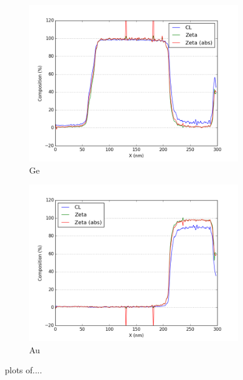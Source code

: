\begin{figure}
\hfill
	\begin{subfigure}{.5\textwidth}
		\centering
		\includegraphics[width=\linewidth]{fig/q/2_Ge2}
		\caption{Ge}
		\label{fig:zeta_area2_ge}
	\end{subfigure}%
\hfill
	\begin{subfigure}{.5\textwidth}
		\centering
		\includegraphics[width=\linewidth]{fig/q/2_Au2}
		\caption{Au}
		\label{fig:zeta_area2_au}
	\end{subfigure}
		\centering
	\caption{plots of....}
	\label{fig:zeta_area2}
\end{figure}


